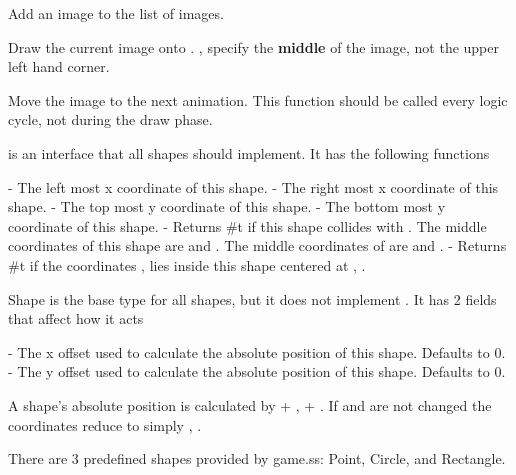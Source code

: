 Add an image to the list of images.


Draw the current image onto . ,  specify the {\bf middle} of the image, not the upper left hand corner.


Move the image to the next animation. This function should be called every logic cycle, not during the draw phase.


 is an interface that all shapes should implement. It has the following functions

 - The left most x coordinate of this shape.\newline
{} - The right most x coordinate of this shape.\newline
{} - The top most y coordinate of this shape.\newline
{} - The bottom most y coordinate of this shape.\newline
{} - Returns #t if this shape collides with . The middle coordinates of this shape are  and . The middle coordinates of  are  and .\newline
{} - Returns #t if the coordinates ,  lies inside this shape centered at , .


Shape is the base type for all shapes, but it does not implement . It has 2 fields that affect how it acts

 - The x offset used to calculate the absolute position of this shape. Defaults to 0.
 - The y offset used to calculate the absolute position of this shape. Defaults to 0.

A shape's absolute position is calculated by  + ,  + . If  and  are not changed the coordinates reduce to simply , .

There are 3 predefined shapes provided by game.ss: Point, Circle, and Rectangle.


